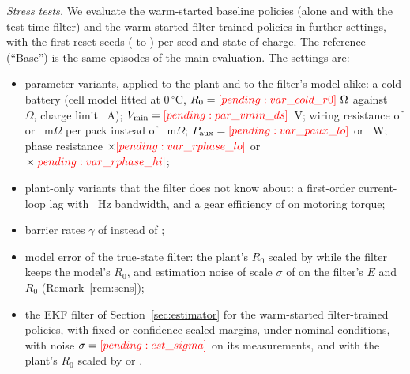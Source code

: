\emph{Stress tests.} We evaluate the warm-started baseline policies (alone and with the test-time filter) and the warm-started filter-trained policies in  further settings, with the first  reset seeds ( to ) per seed and state of charge. The reference (``Base'') is the same episodes of the main evaluation. The settings are:
\begin{itemize}
\item parameter variants, applied to the plant and to the filter's model alike: a cold battery (cell model fitted at 0\,$^\circ$C, $R_0=\res{var_cold_r0}~\Omega$ against ~$\Omega$, charge limit ~A); $V_{\min}=\res{par_vmin_ds}$~V; wiring resistance of  or ~m$\Omega$ per pack instead of ~m$\Omega$; $P_{\mathrm{aux}}=\res{var_paux_lo}$ or ~W; phase resistance $\times\res{var_rphase_lo}$ or $\times\res{var_rphase_hi}$;
\item plant-only variants that the filter does not know about: a first-order current-loop lag with ~Hz bandwidth, and a gear efficiency of  on motoring torque;
\item barrier rates $\gamma$ of  instead of ;
\item model error of the true-state filter: the plant's $R_0$ scaled by  while the filter keeps the model's $R_0$, and estimation noise of scale $\sigma$ of  on the filter's $E$ and $R_0$ (Remark~\ref{rem:sens});
\item the EKF filter of Section~\ref{sec:estimator} for the warm-started filter-trained policies, with fixed or confidence-scaled margins, under nominal conditions, with noise $\sigma=\res{est_sigma}$ on its measurements, and with the plant's $R_0$ scaled by  or .
\end{itemize}

